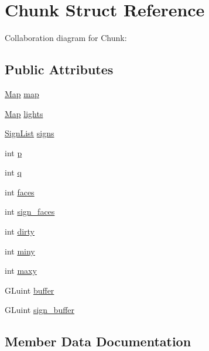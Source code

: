 \hypertarget{structChunk}{}\section{Chunk Struct Reference}
\label{structChunk}


Collaboration diagram for Chunk\+:
\subsection*{Public Attributes}
\begin{DoxyCompactItemize}
\item 
\hyperlink{structMap}{Map} \hyperlink{structChunk_ac925ff5f92406dea6f56044d7e1e2089}{map}
\item 
\hyperlink{structMap}{Map} \hyperlink{structChunk_a5c3da6f37c20d1a9e4a6b128d9b4cfc2}{lights}
\item 
\hyperlink{structSignList}{Sign\+List} \hyperlink{structChunk_acd18dcf6bf17f499e36b5806519d8800}{signs}
\item 
int \hyperlink{structChunk_a016383084b50c856a1fb63f97ca63dc6}{p}
\item 
int \hyperlink{structChunk_a20fb30e8ac307726320ef6d3e4cd89a1}{q}
\item 
int \hyperlink{structChunk_aed1e3841c79fac84de3514739ca0ff0e}{faces}
\item 
int \hyperlink{structChunk_a6ffdf89c012dfaefe531aa0eb93fe69a}{sign\+\_\+faces}
\item 
int \hyperlink{structChunk_a67d8b303bbdb6b9928fec2783d08f59f}{dirty}
\item 
int \hyperlink{structChunk_a528c51d2899b3f2d2c1fa8d7ef90621a}{miny}
\item 
int \hyperlink{structChunk_a3745b0b938e79f1ee64eff354994994e}{maxy}
\item 
G\+Luint \hyperlink{structChunk_a37268084ae967da79d9e47033fcfd259}{buffer}
\item 
G\+Luint \hyperlink{structChunk_a7c89d7fc29dbdd94c50280e92def013c}{sign\+\_\+buffer}
\end{DoxyCompactItemize}


\subsection{Member Data Documentation}
\mbox{\label{structChunk_a37268084ae967da79d9e47033fcfd259}} 

